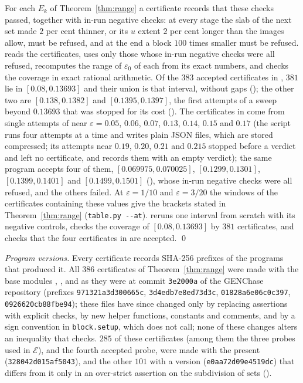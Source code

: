 \documentclass[11pt]{article}
\theoremstyle{definition}
\newcommand{\eps}{\varepsilon}
\begin{document}
For each $E_k$ of Theorem~\ref{thm:range} a certificate records that these checks passed, together with in-run negative checks: at every stage the slab of the next set made $2$ per cent thinner, or its $u$ extent $2$ per cent longer than the images allow, must be refused, and at the end a block $100$ times smaller must be refused.  reads the certificates, uses only those whose in-run negative checks were all refused, recomputes the range of $\eps_0$ of each from its exact numbers, and checks the coverage in exact rational arithmetic. Of the $383$ accepted certificates in , $381$ lie in $[0.08, 0.13693]$ and their union is that interval, without gaps (); the other two are $[0.138, 0.1382]$ and $[0.1395, 0.1397]$, the first attempts of a sweep beyond $0.13693$ that was stopped for its cost (). The certificates in  come from single attempts of  near $\eps = 0.05$, $0.06$, $0.07$, $0.13$, $0.14$, $0.15$ and $0.17$ (the script runs four attempts at a time and writes plain JSON files, which are stored compressed; its attempts near $0.19$, $0.20$, $0.21$ and $0.215$ stopped before a verdict and left no certificate, and  records them with an empty verdict); the same program accepts four of them, $[0.069975, 0.070025]$, $[0.1299, 0.1301]$, $[0.1399, 0.1401]$ and $[0.1499, 0.1501]$ (), whose in-run negative checks were all refused, and the others failed. At $\eps = 1/10$ and $\eps = 3/20$ the windows of the certificates containing these values give the brackets stated in Theorem~\ref{thm:range} (\texttt{table.py -{}-at}).  reruns one interval from scratch with its negative controls, checks the coverage of $[0.08, 0.13693]$ by $381$ certificates, and checks that the four certificates in  are accepted. \qed

\emph{Program versions.} Every certificate records SHA-256 prefixes of the programs that produced it. All $386$ certificates of Theorem~\ref{thm:range} were made with the base modules , ,  and  as they were at commit \texttt{3e2000a} of the GENChase repository (prefixes \texttt{971321a3d300665c}, \texttt{3d4edb7e8ed73d3c}, \texttt{01828a6e06c0c397}, \texttt{0926620cb88fbe94}); these files have since changed only by replacing assertions with explicit checks, by new helper functions, constants and comments, and by a sign convention in \texttt{block.setup}, which  does not call; none of these changes alters an inequality that  checks. $285$ of these certificates (among them the three probes used in $\mathcal{E}$), and the fourth accepted probe, were made with the present  (\texttt{328042d015af5043}), and the other $101$ with a version (\texttt{e0aa72d09e4519dc}) that differs from it only in an over-strict assertion on the subdivision of sets ().
\end{document}
